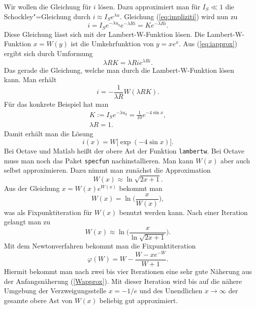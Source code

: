 \documentclass[a4paper,10pt,fleqn,twocolumn,twoside,dvipdfmx]{scrartcl}
\numberwithin{equation}{section}
\begin{document}
Wir wollen die Gleichung für $i$ lösen. Dazu approximiert man für
$I_S\ll 1$ die Schockley"=Gleichung durch $i\approx I_S e^{\lambda u}$.
Gleichung (\ref{eq:impliziti}) wird nun zu%
\begin{equation}\label{eq:iapprox}
i=I_Se^{-\lambda u_q}e^{-\lambda Ri} = Ke^{-\lambda Ri}.
\end{equation}
Diese Gleichung lässt sich mit der Lambert-W-Funktion lösen.
Die Lambert-W-Funktion $x=W(y)$ ist die Umkehrfunktion von
$y=xe^x$. Aus (\ref{eq:iapprox}) ergibt sich durch Umformung%
\begin{equation}
\lambda RK = \lambda Rie^{\lambda Ri}.
\end{equation}
Das gerade die Gleichung, welche man durch die Lambert-W-Funktion
lösen kann. Man erhält%
\begin{equation}
i = -\frac{1}{\lambda R}W(\lambda RK).
\end{equation}
Für das konkrete Beispiel hat man
\begin{gather*}
K:=I_S e^{-\lambda u_q} = \frac{1}{10}e^{-4\sin x},\\
\lambda R = 1.
\end{gather*}
Damit erhält man die Lösung
\begin{equation}
i(x) = W[\exp(-4\sin x)\big].
\end{equation}
Bei Octave und Matlab heißt der obere Ast der Funktion
\texttt{lambertw}. Bei Octave muss man noch das Paket
\texttt{specfun} nachinstallieren. Man kann $W(x)$ aber auch
selbst approximieren. Dazu nimmt man zunächst die Approximation%
\begin{equation}\label{Wapprox}
W(x)\approx \ln\sqrt{2x+1}.
\end{equation}
Aus der Gleichung $x=W(x)e^{W(x)}$ bekommt man%
\begin{equation}
W(x) = \ln\Big(\frac{x}{W(x)}\Big),
\end{equation}
was als Fixpunktiteration für $W(x)$ benutzt werden kann.
Nach einer Iteration gelangt man zu%
\begin{equation}
W(x)\approx \ln\bigg(\frac{x}{\ln\sqrt{2x+1}}\bigg).
\end{equation}
Mit dem Newtonverfahren bekommt man die Fixpunktiteration%
\begin{equation}
\varphi(W) = W-\frac{W-xe^{-W}}{W+1}.
\end{equation}
Hiermit bekommt man nach zwei bis vier Iterationen eine sehr gute
Näherung aus der Anfangsnäherung (\ref{Wapprox}). Mit dieser
Iteration wird bis auf die nähere Umgebung der Verzweigungsstelle
$x=-1/e$ und des Unendlichen $x\rightarrow\infty$ der gesamte
obere Ast von $W(x)$ beliebig gut approximiert.
\end{document}
